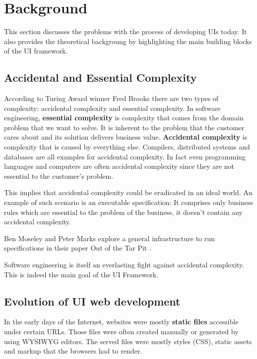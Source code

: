 \section{Background}\label{background}

This section discusses the problems with the process of developing UIs today. It also provides the theoretical backgroung by highlighting the main building blocks of the UI framework.

\subsection{Accidental and Essential Complexity}\label{history}

According to Turing Award winner Fred Brooks there are two types of complexity: accidental complexity and essential complexity. \citep{nosilverbullet}
In software engineering, \textbf{essential complexity} is complexity that comes from the domain problem that we want to solve. It is inherent to the problem that the customer cares about and its solution delivers business value. \textbf{Accidental complexity} is complexity that is caused by everything else. Compilers, distributed systems and databases are all examples for accidental complexity. In fact even programming languages and computers are often accidental complexity since they are not essential to the customer's problem.

This implies that accidental complexity could be eradicated in an ideal world. An example of such scenario is an executable specification: It comprises only business rules which are essential to the problem of the business, it doesn't contain any accidental complexity.

Ben Moseley and Peter Marks explore a general infrastructure to run specifications in their paper Out of the Tar Pit \citep{outoftarpit}.

Software engineering is itself an everlasting fight against accidental complexity. This is indeed the main goal of the UI Framework.

\subsection{Evolution of UI web development}\label{history}

In the early days of the Internet, websites were mostly \textbf{static files} accessible under certain URLs. Those files were often created manually or generated by using WYSIWYG editors. The served files were mostly styles (CSS), static assets and markup that the browsers had to render.

